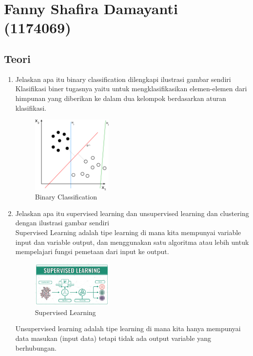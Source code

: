 \section{Fanny Shafira Damayanti (1174069)}
\subsection{Teori}
\begin{enumerate}

\item Jelaskan apa itu binary classiﬁcation dilengkapi ilustrasi gambar sendiri\\
Klasifikasi biner tugasnya yaitu untuk mengklasifikasikan elemen-elemen dari himpunan yang diberikan ke dalam dua kelompok berdasarkan aturan klasifikasi.

\begin{figure}[H]
		\includegraphics[width=4cm]{figures/1174069/2/binclass.png}
		\centering
		\caption{Binary Classification}
	\end{figure}

\item Jelaskan apa itu supervised learning dan unsupervised learning dan clustering dengan ilustrasi gambar sendiri\\

Supervised Learning adalah tipe learning di mana kita mempunyai variable input dan variable output, dan menggunakan satu algoritma atau lebih untuk mempelajari fungsi pemetaan dari input ke output.

\begin{figure}[H]
		\includegraphics[width=4cm]{figures/1174069/2/sl.png}
		\centering
		\caption{Supervised Learning}
	\end{figure}
	
Unsupervised learning adalah tipe learning di mana kita hanya mempunyai data masukan (input data) tetapi tidak ada output variable yang berhubungan.


\end{enumerate}
